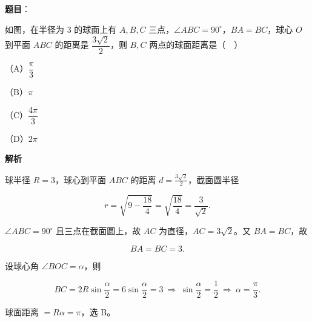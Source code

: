 \begin{answer}

\textbf{题目}：

如图，在半径为 $3$ 的球面上有 $A,B,C$ 三点，$\angle ABC=90^\circ$，$BA=BC$，球心 $O$ 到平面 $ABC$ 的距离是 $\dfrac{3\sqrt2}{2}$，则 $B,C$ 两点的球面距离是（　）
\nopagebreak[4]
\begin{center}\end{center}
\nopagebreak[4]
（A）$\dfrac{\pi}{3}$

（B）$\pi$

（C）$\dfrac{4\pi}{3}$

（D）$2\pi$

\textbf{解析}

球半径 $R=3$，球心到平面 $ABC$ 的距离 $d=\frac{3\sqrt2}{2}$，截面圆半径

\nopagebreak[4]
\[r=\sqrt{9-\frac{18}{4}}=\sqrt{\frac{18}{4}}=\frac{3}{\sqrt2}.\]

$\angle ABC=90^\circ$ 且三点在截面圆上，故 $AC$ 为直径，$AC=3\sqrt2$。又 $BA=BC$，故

\nopagebreak[4]
\[BA=BC=3 .\]

设球心角 $\angle BOC=\alpha$，则

\nopagebreak[4]
\[BC=2R\sin\frac\alpha2=6\sin\frac\alpha2=3
\ \Longrightarrow\ \sin\frac\alpha2=\frac12
\ \Longrightarrow\ \alpha=\frac\pi3 .\]

球面距离 $=R\alpha=\pi$，选 B。


\end{answer}

